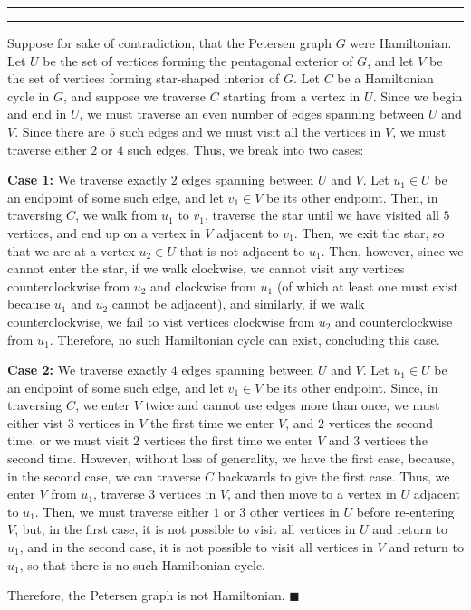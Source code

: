 \documentclass[11pt]{article}
\newcounter{questionCounter}
\newcounter{partCounter}[questionCounter]
\newenvironment{question}[2][\arabic{questionCounter}]{%
    \setcounter{partCounter}{0}%
    \vspace{.25in} \hrule \vspace{0.5em}%
        \noindent{\bf #2}%
    \vspace{0.8em} \hrule \vspace{.10in}%
    \addtocounter{questionCounter}{1}%
}{}
\begin{document}
\begin{question}{Problem 8}
Suppose for sake of contradiction, that the Petersen graph $G$ were
Hamiltonian. Let $U$ be the set of vertices forming the pentagonal exterior of
$G$, and let $V$ be the set of vertices forming star-shaped interior of $G$.
Let $C$ be a Hamiltonian cycle in $G$, and suppose we traverse $C$ starting
from a vertex in $U$. Since we begin and end in $U$, we must traverse an even
number of edges spanning between $U$ and $V$. Since there are $5$ such edges
and we must visit all the vertices in $V$, we must traverse either $2$ or $4$
such edges. Thus, we break into two cases:

{\bf Case 1:} We traverse exactly $2$ edges spanning between $U$ and $V$.
Let $u_1 \in U$ be an endpoint of some such edge, and let $v_1 \in V$ be its
other endpoint. Then, in traversing $C$, we walk from $u_1$ to $v_1$, traverse
the star until we have visited all $5$ vertices, and end up on a vertex in $V$
adjacent to $v_1$. Then, we exit the star, so that we are at a vertex
$u_2 \in U$ that is not adjacent to $u_1$. Then, however, since we cannot
enter the star, if we walk clockwise, we cannot visit any vertices
counterclockwise from $u_2$ and clockwise from $u_1$ (of which at least one
must exist because $u_1$ and $u_2$ cannot be adjacent), and similarly, if we
walk counterclockwise, we fail to vist vertices clockwise from $u_2$ and
counterclockwise from $u_1$. Therefore, no such Hamiltonian cycle can exist,
concluding this case.

{\bf Case 2:} We traverse exactly $4$ edges spanning between $U$ and $V$.
Let $u_1 \in U$ be an endpoint of some such edge, and let $v_1 \in V$ be its
other endpoint. Since, in traversing $C$, we enter $V$ twice and cannot use
edges more than once, we must either vist $3$ vertices in $V$ the first time
we enter $V$, and $2$ vertices the second time, or we must visit $2$ vertices
the first time we enter $V$ and $3$ vertices the second time. However, without
loss of generality, we have the first case, because, in the second case, we
can traverse $C$ backwards to give the first case. Thus, we enter $V$ from
$u_1$, traverse $3$ vertices in $V$, and then move to a vertex in $U$ adjacent
to $u_1$. Then, we must traverse either $1$ or $3$ other vertices in $U$
before re-entering $V$, but, in the first case, it is not possible to visit
all vertices in $U$ and return to $u_1$, and in the second case, it is not
possible to visit all vertices in $V$ and return to $u_1$, so that there is
no such Hamiltonian cycle.

Therefore, the Petersen graph is not Hamiltonian. \quad $\blacksquare$
\end{question}
\end{document}
